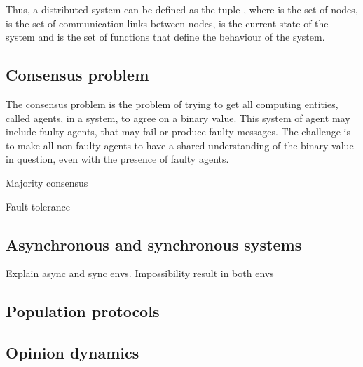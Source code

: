 Thus, a distributed system can be defined as the tuple , where  is the set of nodes,  is the set of communication links between nodes,  is the current state of the system and  is the set of functions that define the behaviour of the system.

\subsection{Consensus problem}

The consensus problem is the problem of trying to get all computing entities, called agents, in a system, to agree on a binary value. This system of agent may include faulty agents, that may fail or produce faulty messages. The challenge is to make all non-faulty agents to have a shared understanding of the binary value in question, even with the presence of faulty agents. 

Majority consensus

Fault tolerance

\subsection{Asynchronous and synchronous systems}

Explain async and sync envs. Impossibility result in both envs

\subsection{Population protocols}



\subsection{Opinion dynamics}


